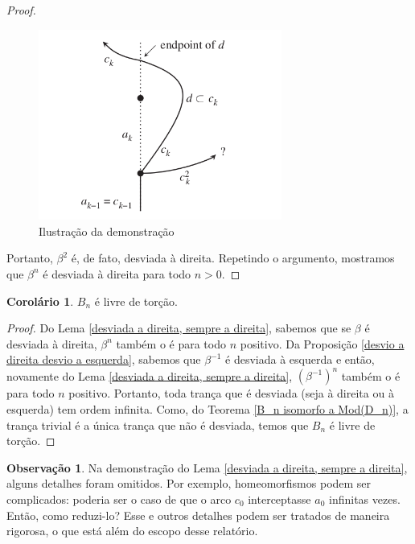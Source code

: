 \documentclass[a4paper,portuguese,11pt,twoside, leqno]{book}
\theoremstyle{definition}
\newtheorem{corollary}{Corolário}[theorem]
\newtheorem{remark}{Observação}[section]
\begin{document}
\begin{proof}
		\begin{figure}[H]
			\begin{center}
				\includegraphics[width=8cm]{demosntracao_lema.png}
			\end{center}\caption{Ilustração da demonstração}
			\label{ilustracao da demonstracao}
		\end{figure}
		\par\vspace{0.3cm} Portanto, $\beta^2$ é, de fato, desviada à direita. Repetindo o argumento, mostramos que $\beta^n$ é desviada à direita para todo $n>0$.
	\end{proof}
	
	\begin{corollary}
		\label{B_n livre de torcao por diagramas de curva}
		$B_n$ é livre de torção.
	\end{corollary}
	\begin{proof}
		Do Lema \eqref{desviada a direita, sempre a direita}, sabemos que se $\beta$ é desviada à direita, $\beta^n$ também o é para todo $n$ positivo. Da Proposição \eqref{desvio a direita desvio a esquerda}, sabemos que $\beta^{-1}$ é desviada à esquerda e então, novamente do Lema \eqref{desviada a direita, sempre a direita}, $(\beta^{-1})^n$ também o é para todo $n$ positivo. Portanto, toda trança que é desviada (seja à direita ou à esquerda) tem ordem infinita. Como, do Teorema \eqref{B_n isomorfo a Mod(D_n)}, a trança trivial é a única trança que não é desviada, temos que $B_n$ é livre de torção.
	\end{proof}
	
	\begin{remark}
		Na demonstração do Lema \eqref{desviada a direita, sempre a direita}, alguns detalhes foram omitidos. Por exemplo, homeomorfismos podem ser complicados: poderia ser o caso de que o arco $c_0$ interceptasse $a_0$ infinitas vezes. Então, como reduzi-lo? Esse e outros detalhes podem ser tratados de maneira rigorosa, o que está além do escopo desse relatório.
	\end{remark}
	
\end{document}
